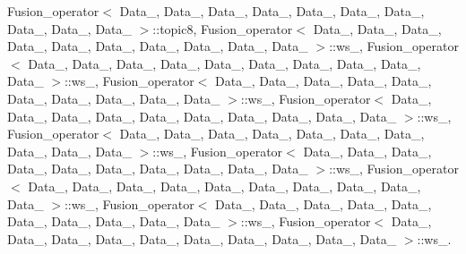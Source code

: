 Fusion\+\_\+operator$<$ Data\+\_, Data\+\_, Data\+\_, Data\+\_, Data\+\_, Data\+\_, Data\+\_, Data\+\_, Data\+\_, Data\+\_ $>$\+::topic8, Fusion\+\_\+operator$<$ Data\+\_, Data\+\_, Data\+\_, Data\+\_, Data\+\_, Data\+\_, Data\+\_, Data\+\_, Data\+\_, Data\+\_ $>$\+::ws\+\_, Fusion\+\_\+operator$<$ Data\+\_, Data\+\_, Data\+\_, Data\+\_, Data\+\_, Data\+\_, Data\+\_, Data\+\_, Data\+\_, Data\+\_ $>$\+::ws\+\_, Fusion\+\_\+operator$<$ Data\+\_, Data\+\_, Data\+\_, Data\+\_, Data\+\_, Data\+\_, Data\+\_, Data\+\_, Data\+\_, Data\+\_ $>$\+::ws\+\_, Fusion\+\_\+operator$<$ Data\+\_, Data\+\_, Data\+\_, Data\+\_, Data\+\_, Data\+\_, Data\+\_, Data\+\_, Data\+\_, Data\+\_ $>$\+::ws\+\_, Fusion\+\_\+operator$<$ Data\+\_, Data\+\_, Data\+\_, Data\+\_, Data\+\_, Data\+\_, Data\+\_, Data\+\_, Data\+\_, Data\+\_ $>$\+::ws\+\_, Fusion\+\_\+operator$<$ Data\+\_, Data\+\_, Data\+\_, Data\+\_, Data\+\_, Data\+\_, Data\+\_, Data\+\_, Data\+\_, Data\+\_ $>$\+::ws\+\_, Fusion\+\_\+operator$<$ Data\+\_, Data\+\_, Data\+\_, Data\+\_, Data\+\_, Data\+\_, Data\+\_, Data\+\_, Data\+\_, Data\+\_ $>$\+::ws\+\_, Fusion\+\_\+operator$<$ Data\+\_, Data\+\_, Data\+\_, Data\+\_, Data\+\_, Data\+\_, Data\+\_, Data\+\_, Data\+\_, Data\+\_ $>$\+::ws\+\_, Fusion\+\_\+operator$<$ Data\+\_, Data\+\_, Data\+\_, Data\+\_, Data\+\_, Data\+\_, Data\+\_, Data\+\_, Data\+\_, Data\+\_ $>$\+::ws\+\_.

